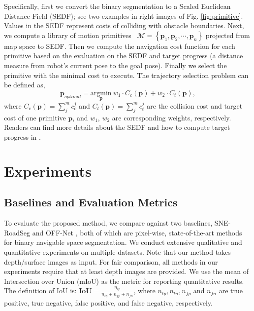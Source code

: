 \documentclass[letterpaper, 10 pt, journal, twoside]{ieeetran}
\begin{document}
Specifically, first we convert the binary segmentation to a Scaled Euclidean Distance Field (SEDF); see two examples in right images of Fig. \ref{fig:primitive}. Values in the SEDF represent costs of colliding with obstacle boundaries. Next, we compute a library of motion primitives~\cite{howard2007optimal, howard2008state} $\mathcal{M} = \left \{ \mathbf{p}_1, \mathbf{p}_2, \cdots, \mathbf{p}_n \right \}$ projected from map space to SEDF.
Then we compute the navigation cost function for each primitive based on the evaluation on the SEDF and target progress (a distance measure from robot's current pose to the goal pose). Finally we select the primitive with the minimal cost to execute. The trajectory selection problem can be defined as,
\begin{equation}
    \label{eq:traj_selection}
    \mathbf{p}_{optimal} = \underset{\mathbf{p}}{\text{argmin}}~ w_1 \cdot C_{c}(\mathbf{p}) + w_2 \cdot C_{t}(\mathbf{p}),
\end{equation}
where $C_{c}(\mathbf{p}) = \sum_j^m c_c^j$ and $C_{t}(\mathbf{p}) = \sum_j^m c_t^j$ are the collision cost and target cost of one primitive $\mathbf{p}$, and $w_1$, $w_2$ are corresponding weights, respectively. Readers can find more details about the SEDF and how to compute target progress in \cite{chen2022cali}.

\section{Experiments}

\subsection{Baselines and Evaluation Metrics}
\label{sec:baselines_and_metrics}
To evaluate the proposed method, we compare against two baselines, SNE-RoadSeg \cite{fan2020sne} and OFF-Net \cite{min2022orfd}, both of which are pixel-wise, state-of-the-art methods for binary navigable space segmentation. We conduct extensive qualitative and quantitative experiments on multiple datasets. Note that our method takes depth/surface images as input. For fair comparison, all methods in our experiments require that at least depth images are provided. We use the mean of Intersection over Union (mIoU) as the metric for reporting quantitative results. The definition of IoU is: $\mathbf{IoU} = \frac{n_{tp}}{n_{tp} + n_{fp} + n_{fn}}$, where $n_{tp}, n_{tn}, n_{fp}$ and $n_{fn}$ are true positive, true negative, false positive, and false negative, respectively.
\end{document}
